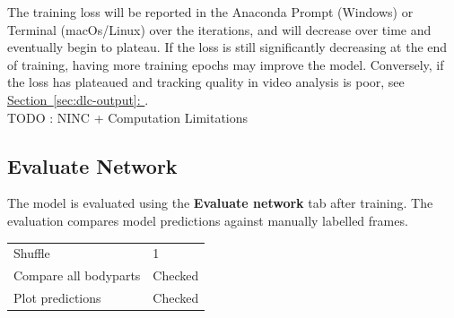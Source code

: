 \documentclass[11pt]{article}
\newcommand{\secref}[1]{\hyperref[#1]{Section~\ref*{#1}: \nameref*{#1}}}
\renewcommand{\[}{%
  \par\smallskip\noindent
  \begin{center}%
  \setlength{\fboxsep}{5pt}%
  \setlength{\fboxrule}{0.35pt}%
  \begin{lrbox}{\almaEquationBox}%
  $\displaystyle
}
\renewcommand{\]}{%
  $%
  \end{lrbox}%
  \fcolorbox{equationLine}{equationBack}{\usebox{\almaEquationBox}}%
  \end{center}%
  \smallskip\par
}
\begin{document}
The training loss will be reported in the Anaconda Prompt (Windows) or Terminal (macOs/Linux) over the iterations, and will decrease over time and eventually begin to plateau. If the loss is still significantly decreasing at the end of training, having more training epochs may improve the model. Conversely, if the loss has plateaued and tracking quality in video analysis is poor, see \secref{sec:dlc-output}. \\
TODO : NINC + Computation Limitations 

\subsection{Evaluate Network}

The model is evaluated using the \textbf{Evaluate network} tab after training. The evaluation compares model predictions against manually labelled frames. 

\begin{tcolorbox}[software settings,title=\textbf{Evaluate Network: Recommended Settings}]
\begin{tabularx}{\linewidth}{KV}
Shuffle & 1 \\
Compare all bodyparts & Checked \\
Plot predictions & Checked \\
\end{tabularx}
\end{tcolorbox}
\end{document}
